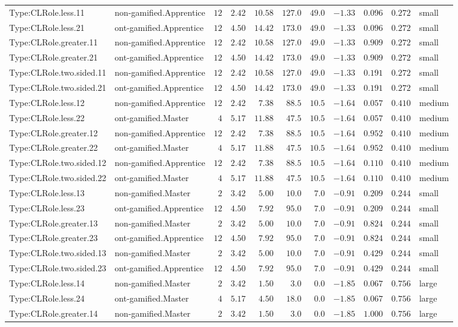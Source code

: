 \documentclass[6pt,a4paper]{article}
\begin{document}
{\begin{longtable}{llrrrrrrrrl}
Type:CLRole.less.11&non-gamified.Apprentice&$12$&$2.42$&$10.58$&$127.0$&$49.0$&$-1.33$&$0.096$&$0.272$&small\tabularnewline
Type:CLRole.less.21&ont-gamified.Apprentice&$12$&$4.50$&$14.42$&$173.0$&$49.0$&$-1.33$&$0.096$&$0.272$&small\tabularnewline
Type:CLRole.greater.11&non-gamified.Apprentice&$12$&$2.42$&$10.58$&$127.0$&$49.0$&$-1.33$&$0.909$&$0.272$&small\tabularnewline
Type:CLRole.greater.21&ont-gamified.Apprentice&$12$&$4.50$&$14.42$&$173.0$&$49.0$&$-1.33$&$0.909$&$0.272$&small\tabularnewline
Type:CLRole.two.sided.11&non-gamified.Apprentice&$12$&$2.42$&$10.58$&$127.0$&$49.0$&$-1.33$&$0.191$&$0.272$&small\tabularnewline
Type:CLRole.two.sided.21&ont-gamified.Apprentice&$12$&$4.50$&$14.42$&$173.0$&$49.0$&$-1.33$&$0.191$&$0.272$&small\tabularnewline
Type:CLRole.less.12&non-gamified.Apprentice&$12$&$2.42$&$ 7.38$&$ 88.5$&$10.5$&$-1.64$&$0.057$&$0.410$&medium\tabularnewline
Type:CLRole.less.22&ont-gamified.Master&$ 4$&$5.17$&$11.88$&$ 47.5$&$10.5$&$-1.64$&$0.057$&$0.410$&medium\tabularnewline
Type:CLRole.greater.12&non-gamified.Apprentice&$12$&$2.42$&$ 7.38$&$ 88.5$&$10.5$&$-1.64$&$0.952$&$0.410$&medium\tabularnewline
Type:CLRole.greater.22&ont-gamified.Master&$ 4$&$5.17$&$11.88$&$ 47.5$&$10.5$&$-1.64$&$0.952$&$0.410$&medium\tabularnewline
Type:CLRole.two.sided.12&non-gamified.Apprentice&$12$&$2.42$&$ 7.38$&$ 88.5$&$10.5$&$-1.64$&$0.110$&$0.410$&medium\tabularnewline
Type:CLRole.two.sided.22&ont-gamified.Master&$ 4$&$5.17$&$11.88$&$ 47.5$&$10.5$&$-1.64$&$0.110$&$0.410$&medium\tabularnewline
Type:CLRole.less.13&non-gamified.Master&$ 2$&$3.42$&$ 5.00$&$ 10.0$&$ 7.0$&$-0.91$&$0.209$&$0.244$&small\tabularnewline
Type:CLRole.less.23&ont-gamified.Apprentice&$12$&$4.50$&$ 7.92$&$ 95.0$&$ 7.0$&$-0.91$&$0.209$&$0.244$&small\tabularnewline
Type:CLRole.greater.13&non-gamified.Master&$ 2$&$3.42$&$ 5.00$&$ 10.0$&$ 7.0$&$-0.91$&$0.824$&$0.244$&small\tabularnewline
Type:CLRole.greater.23&ont-gamified.Apprentice&$12$&$4.50$&$ 7.92$&$ 95.0$&$ 7.0$&$-0.91$&$0.824$&$0.244$&small\tabularnewline
Type:CLRole.two.sided.13&non-gamified.Master&$ 2$&$3.42$&$ 5.00$&$ 10.0$&$ 7.0$&$-0.91$&$0.429$&$0.244$&small\tabularnewline
Type:CLRole.two.sided.23&ont-gamified.Apprentice&$12$&$4.50$&$ 7.92$&$ 95.0$&$ 7.0$&$-0.91$&$0.429$&$0.244$&small\tabularnewline
Type:CLRole.less.14&non-gamified.Master&$ 2$&$3.42$&$ 1.50$&$  3.0$&$ 0.0$&$-1.85$&$0.067$&$0.756$&large\tabularnewline
Type:CLRole.less.24&ont-gamified.Master&$ 4$&$5.17$&$ 4.50$&$ 18.0$&$ 0.0$&$-1.85$&$0.067$&$0.756$&large\tabularnewline
Type:CLRole.greater.14&non-gamified.Master&$ 2$&$3.42$&$ 1.50$&$  3.0$&$ 0.0$&$-1.85$&$1.000$&$0.756$&large\tabularnewline

\end{longtable}}
\end{document}
